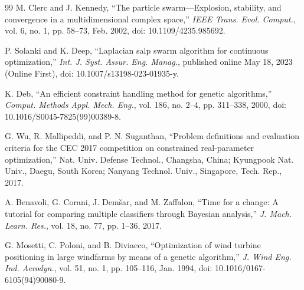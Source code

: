 {\begin{thebibliography}{99}
M. Clerc and J. Kennedy, ``The particle swarm---Explosion, stability, and convergence in a multidimensional complex space,'' \textit{IEEE Trans. Evol. Comput.}, vol. 6, no. 1, pp. 58--73, Feb. 2002, doi: 10.1109/4235.985692.

P. Solanki and K. Deep, ``Laplacian salp swarm algorithm for continuous optimization,'' \textit{Int. J. Syst. Assur. Eng. Manag.}, published online May 18, 2023 (Online First), doi: 10.1007/s13198-023-01935-y.

K. Deb, ``An efficient constraint handling method for genetic algorithms,'' \textit{Comput. Methods Appl. Mech. Eng.}, vol. 186, no. 2--4, pp. 311--338, 2000, doi: 10.1016/S0045-7825(99)00389-8.

G. Wu, R. Mallipeddi, and P. N. Suganthan, ``Problem definitions and evaluation criteria for the CEC 2017 competition on constrained real-parameter optimization,'' Nat. Univ. Defense Technol., Changsha, China; Kyungpook Nat. Univ., Daegu, South Korea; Nanyang Technol. Univ., Singapore, Tech. Rep., 2017.

A. Benavoli, G. Corani, J. Dem\v{s}ar, and M. Zaffalon, ``Time for a change: A tutorial for comparing multiple classifiers through Bayesian analysis,'' \textit{J. Mach. Learn. Res.}, vol. 18, no. 77, pp. 1--36, 2017.

G. Mosetti, C. Poloni, and B. Diviacco, ``Optimization of wind turbine positioning in large windfarms by means of a genetic algorithm,'' \textit{J. Wind Eng. Ind. Aerodyn.}, vol. 51, no. 1, pp. 105--116, Jan. 1994, doi: 10.1016/0167-6105(94)90080-9.


\end{thebibliography}}
